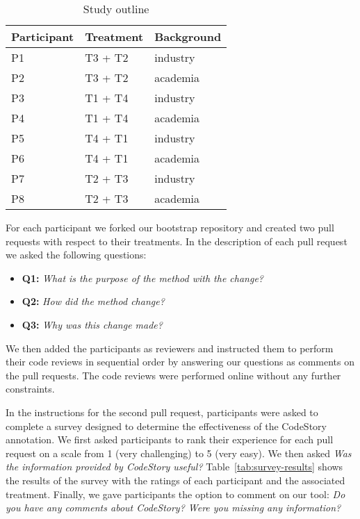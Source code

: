 \documentclass[../manifest.tex]{subfiles}
\begin{document}
\begin{table*}[t]
    \centering
    \begin{threeparttable}
    \begin{tabular*}{\textwidth}{lll}
    \hline
    \textbf{Participant} & \textbf{Treatment} & \textbf{Background} \\
    \hline
    P1 & T3 + T2 & industry \\
    P2 & T3 + T2 & academia \\
    P3 & T1 + T4 & industry \\
    P4 & T1 + T4 & academia \\
    P5 & T4 + T1 & industry \\
    P6 & T4 + T1 & academia \\
    P7 & T2 + T3 & industry \\
    P8 & T2 + T3 & academia \\
    \hline
    \end{tabular*}
    \end{threeparttable}
    \caption{Study outline}
    \label{tab:study-outline}
\end{table*}

For each participant we forked our bootstrap repository and created two pull requests with respect to their treatments. In the description of each pull request we asked the following questions:
\begin{itemize}
  \item \textbf{Q1:} \textit{What is the purpose of the method with the change?}
  \item \textbf{Q2:} \textit{How did the method change?}
  \item \textbf{Q3:} \textit{Why was this change made?}
\end{itemize}

We then added the participants as reviewers and instructed them to perform their code reviews in sequential order by answering our questions as comments on the pull requests. The code reviews were performed online without any further constraints.

In the instructions for the second pull request, participants were asked to complete a survey designed to determine the effectiveness of the CodeStory annotation. We first asked participants to rank their experience for each pull request on a scale from 1 (very challenging) to 5 (very easy). We then asked \textit{Was the information provided by CodeStory useful?} Table~\ref{tab:survey-results} shows the results of the survey with the ratings of each participant and the associated treatment. Finally, we gave participants the option to comment on our tool: \textit{Do you have any comments about CodeStory? Were you missing any information?}
\end{document}
